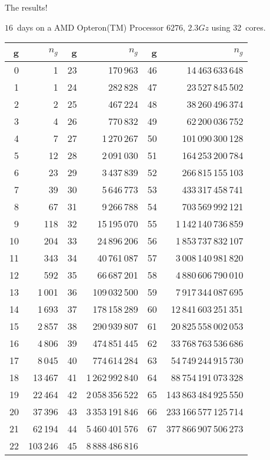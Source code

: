 \documentclass[compress,11pt]{beamer}
\begin{document}
\begin{frame}[fragile]{The results!}

$16$~days on a AMD Opteron(TM) Processor $6276$, $2.3Gz$ using 32~cores.

\tiny
\begin{center}
\begin{tabular}{|r|r||r|r||r|r|}
\hline
g & $n_g$ & g & $n_g$ & g & $n_g$ \\
\hline
0 & 1 & 23 & 170\,963 & 46 & 14\,463\,633\,648\\
1 & 1 & 24 & 282\,828 & 47 & 23\,527\,845\,502\\
2 & 2 & 25 & 467\,224 & 48 & 38\,260\,496\,374\\
3 & 4 & 26 & 770\,832 & 49 & 62\,200\,036\,752\\
4 & 7 & 27 & 1\,270\,267 & 50 & 101\,090\,300\,128\\
5 & 12 & 28 & 2\,091\,030 & 51 & 164\,253\,200\,784\\
6 & 23 & 29 & 3\,437\,839 & 52 & 266\,815\,155\,103\\
7 & 39 & 30 & 5\,646\,773 & 53 & 433\,317\,458\,741\\
8 & 67 & 31 & 9\,266\,788 & 54 & 703\,569\,992\,121\\
9 & 118 & 32 & 15\,195\,070 & 55 & 1\,142\,140\,736\,859\\
10 & 204 & 33 & 24\,896\,206 & 56 & 1\,853\,737\,832\,107\\
11 & 343 & 34 & 40\,761\,087 & 57 & 3\,008\,140\,981\,820\\
12 & 592 & 35 & 66\,687\,201 & 58 & 4\,880\,606\,790\,010\\
13 & 1\,001 & 36 & 109\,032\,500 & 59 & 7\,917\,344\,087\,695\\
14 & 1\,693 & 37 & 178\,158\,289 & 60 & 12\,841\,603\,251\,351\\
15 & 2\,857 & 38 & 290\,939\,807 & 61 & 20\,825\,558\,002\,053\\
16 & 4\,806 & 39 & 474\,851\,445 & 62 & 33\,768\,763\,536\,686\\
17 & 8\,045 & 40 & 774\,614\,284 & 63 & 54\,749\,244\,915\,730\\
18 & 13\,467 & 41 & 1\,262\,992\,840 & 64 & 88\,754\,191\,073\,328\\
19 & 22\,464 & 42 & 2\,058\,356\,522 & 65 & 143\,863\,484\,925\,550\\
20 & 37\,396 & 43 & 3\,353\,191\,846 & 66 & 233\,166\,577\,125\,714\\
21 & 62\,194 & 44 & 5\,460\,401\,576 & 67 & 377\,866\,907\,506\,273\\
22 & 103\,246 & 45 & 8\,888\,486\,816 & &\\
\hline
\end{tabular}
\end{center}
\end{frame}
\end{document}
